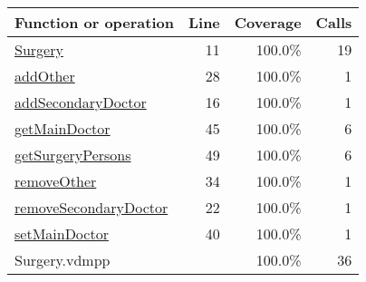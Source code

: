 \bigskip
\begin{longtable}{|l|r|r|r|}
\hline
Function or operation & Line & Coverage & Calls \\
\hline
\hline
\hyperref[Surgery:11]{Surgery} & 11&100.0\% & 19 \\
\hline
\hyperref[addOther:28]{addOther} & 28&100.0\% & 1 \\
\hline
\hyperref[addSecondaryDoctor:16]{addSecondaryDoctor} & 16&100.0\% & 1 \\
\hline
\hyperref[getMainDoctor:45]{getMainDoctor} & 45&100.0\% & 6 \\
\hline
\hyperref[getSurgeryPersons:49]{getSurgeryPersons} & 49&100.0\% & 6 \\
\hline
\hyperref[removeOther:34]{removeOther} & 34&100.0\% & 1 \\
\hline
\hyperref[removeSecondaryDoctor:22]{removeSecondaryDoctor} & 22&100.0\% & 1 \\
\hline
\hyperref[setMainDoctor:40]{setMainDoctor} & 40&100.0\% & 1 \\
\hline
\hline
Surgery.vdmpp & & 100.0\% & 36 \\
\hline
\end{longtable}

